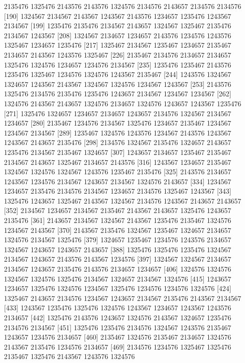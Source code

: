 \documentclass{scrartcl}
\begin{document}
\begin{Schunk}
\begin{Soutput}
 [181] 2135476 1325476 2143576 2143576 1324576 2134576 2143657 2134576 2134576
 [190] 1324567 2134567 2143567 1243567 2143576 1234657 1235476 1243567 2134567
 [199] 1235476 2135476 2134567 2143657 1324567 1325467 2135476 2134567 1243567
 [208] 1324567 2134657 1234657 2143576 1234576 1243576 1325467 1234657 1235476
 [217] 1325467 2134567 1235467 1234657 2135467 2134657 2143567 1243576 1325467
 [226] 2135467 2134576 2134657 2134657 1325476 1324576 1234657 1234576 2134567
 [235] 1235476 1235467 2143576 1235476 1325467 1234576 1324576 1243567 2135467
 [244] 1243576 1324567 1324657 1243567 2143567 1324567 1324576 1234567 1243567
 [253] 2143576 1325476 2134576 2135476 1235476 1243657 2134567 1234567 1234567
 [262] 1324576 2143567 2143657 1324576 2134657 1324576 1243657 1243567 1235476
 [271] 1325476 1324657 1234657 2134657 1243657 2134576 1324567 2134567 1234657
 [280] 2135467 1234576 2134567 1325476 1234657 2135467 1234567 1234567 2134567
 [289] 1235467 1324576 1243576 1234567 2143576 1243567 1243567 2143657 2135476
 [298] 2134576 1324567 2135476 1324657 2143657 1235476 2134567 2135467 1324657
 [307] 1243657 2134657 1235467 2135467 2134567 2143657 1325467 2134657 2143576
 [316] 1243567 1234657 2135467 1324567 1324576 1324567 1243576 1235467 2135476
 [325] 2143576 2134657 1243567 1234576 2134567 1243657 2134567 1324576 2143657
 [334] 1234567 1234657 2135476 2134576 2134567 1234657 2134576 1325467 1243567
 [343] 1325476 1243657 1325467 2143567 1324567 2134576 1243567 2143657 2143657
 [352] 2134567 1234657 2134567 2135467 2143567 2143657 1325476 1243657 2135476
 [361] 2143657 2134567 1324567 2143567 1235476 2135467 1324576 1234567 2143567
 [370] 2143567 2135476 1324567 1235467 1324657 2134657 1324576 2134567 1325476
 [379] 1324657 1235467 1234576 1243576 2134657 1324567 1243657 1243657 2143657
 [388] 1325476 1325476 1235476 1324567 2134567 1243657 2143576 2143567 1234576
 [397] 1324567 1324567 2134657 2134567 1243657 2135476 2143576 2134657 1234657
 [406] 1324576 1324576 1324567 1324576 1325476 2134567 1324657 2134567 1324576
 [415] 1243657 1234657 1325476 1324576 1234567 1325476 1234576 1234576 1324576
 [424] 1325467 2143657 2134576 1234567 1243657 2134567 2135476 2143567 2134567
 [433] 1243567 1235476 1325476 1324576 1243567 1234657 1243567 1243576 2134657
 [442] 1325476 2143576 1243657 1324576 2143567 1324657 1235476 2134576 2134567
 [451] 1325476 1235476 2134576 1324567 1243576 2135467 1243657 1234576 2134657
 [460] 2135467 1324576 2135467 2134657 1324576 2143567 2135476 1234576 2134657
 [469] 2134576 1234576 1325467 1325476 2135467 1325476 2143567 1243576 1324576

\end{Soutput}
\end{Schunk}
\end{document}
